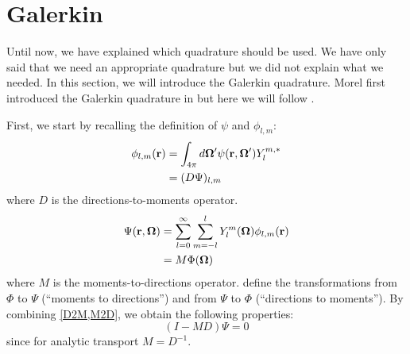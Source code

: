 \section{Galerkin}
Until now, we have explained which quadrature should be used. We have only
said that we need an appropriate quadrature but we did not explain what we
needed. In this section, we will introduce the Galerkin quadrature. Morel
first introduced the Galerkin quadrature in \cite{galerkin_morel} but here we
will follow \cite{pautz_fp}. 

First, we start by recalling the definition of $\psi$ and $\phi_{l,m}$:
\begin{equation}
\begin{split}
\phi_{l,m}(\br) &= \int_{4\pi} d\bo' \psi(\br,\bo') Y_l^{m,*}\\
&=(D \Psi)_{l,m}
\end{split}
\label{D2M}
\end{equation}
where $D$ is the directions-to-moments operator.
\begin{equation}
\begin{split}
\Psi(\br,\bo) &= \sum_{l=0}^{\infty} \sum_{m=-l}^l Y_l^m(\bo)\phi_{l,m}(\br)\\
&= M\Phi(\bo)
\end{split}
\label{M2D}
\end{equation}
where $M$ is the moments-to-directions operator.  define the 
transformations from $\Phi$ to $\Psi$ (``moments to
directions'') and from $\Psi$ to $\Phi$ (``directions to moments''). By
combining \cref{D2M,M2D}, we obtain the following properties:
\begin{equation}
(I-MD)\Psi = 0
\label{identity_alpha}
\end{equation}
since for analytic transport $M=D^{-1}$.


